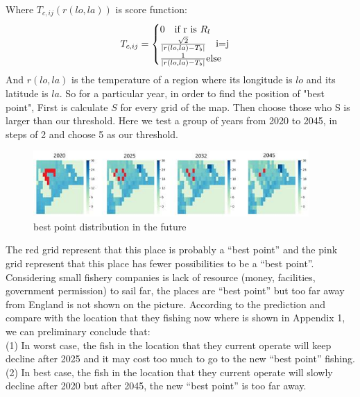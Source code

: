 \documentclass{mcmthesis}
\begin{document}
Where $T_{c,ij}(r(lo,la))$ is score function:
\begin{equation}
T_{c,ij}=
\begin{cases}
0 \text{\quad if r is $R_{l}$} \\
\frac{\sqrt{2}}{|r(lo,la)-T_{b}|} \text{\quad i=j}\\
\frac{1}{|r(lo,la)-T_{b}|} \text{else}
\end{cases}
\end{equation}
And $r(lo,la)$ is the temperature of a region where its longitude is $lo$ and its latitude is $la$. So for a particular year, in order to find the position of "best point", 
First is calculate $S$ for every grid of the map. Then choose those who S is larger than our threshold. Here we test a group of years from 2020 to 2045, in steps of 2 and choose 5 as our threshold.
\textbf{}
\begin{figure}[h]
\centering
\includegraphics[width=10.5cm]{./figures/best.png}
\caption{best point distribution in the future}
\end{figure}
The red grid represent that this place is probably a “best point” and the pink grid represent that this place has fewer possibilities to be a “best point”. Considering small fishery companies is lack of resource (money, facilities, government permission) to sail far, the places are “best point” but too far away from England is not shown on the picture.
According to the prediction and compare with the location that they fishing now where is shown in Appendix 1, we can preliminary conclude that:\\
(1)	In worst case, the fish in the location that they current operate will keep decline after 2025 and it may cost too much to go to the new “best point” fishing.\\
(2)	In best case, the fish in the location that they current operate will slowly decline after 2020 but after 2045, the new “best point” is too far away.
\end{document}
